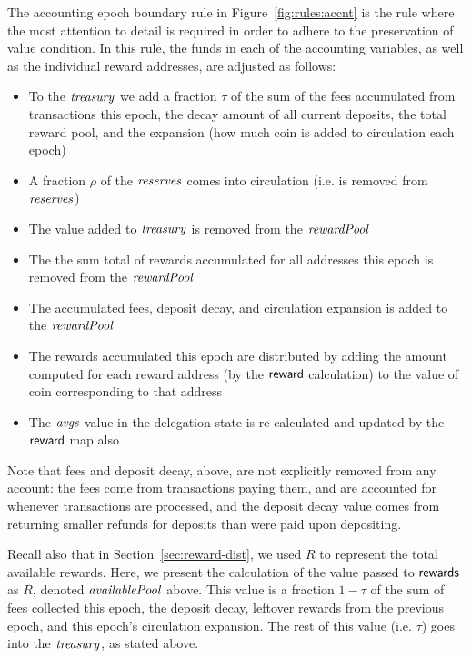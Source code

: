 The accounting epoch boundary rule in Figure~\ref{fig:rules:accnt} is the rule
where the most attention to detail is required in order to adhere to the
preservation of value condition. In this rule, the funds in each of the
accounting variables, as well as the individual reward addresses, are adjusted
as follows:

\begin{itemize}
\item To the $\mathit{treasury}$ we add a fraction $\tau$ of the sum of
the fees accumulated from transactions this epoch, the decay amount
of all current deposits, the total reward pool, and the expansion (how much
coin is added to circulation each epoch)
\item A fraction $\rho$ of the $\mathit{reserves}$ comes into circulation (i.e.
is removed from $\mathit{reserves}$)
\item The value added to $\mathit{treasury}$ is removed from the $\mathit{rewardPool}$
\item The the sum total of rewards accumulated for all addresses this epoch
is removed from the $\mathit{rewardPool}$
\item The accumulated fees, deposit decay, and circulation expansion is
added to the $\mathit{rewardPool}$
\item The rewards accumulated this epoch are distributed by
adding the amount computed for each reward address (by the $\mathsf{reward}$ calculation)
to the value of coin corresponding to that address
\item The $\mathit{avgs}$ value in the delegation state is re-calculated and
updated by the $\mathsf{reward}$ map also
\end{itemize}

Note that fees and deposit decay, above, are not explicitly removed from any account:
the fees come from transactions paying them, and are accounted for whenever
transactions are processed, and the deposit decay value comes from returning
smaller refunds for deposits than were paid upon depositing.

Recall also that in Section~\ref{sec:reward-dist}, we used $R$ to represent
the total available rewards. Here, we present the calculation of the value
passed to $\mathsf{rewards}$ as $R$, denoted $\mathit{availablePool}$ above.
This value is a fraction $1-\tau$ of the sum of fees collected this epoch, the
deposit decay, leftover rewards from
the previous epoch, and this epoch's circulation expansion. The rest of this
value (i.e. $\tau$) goes into the $\mathit{treasury}$, as stated above.


